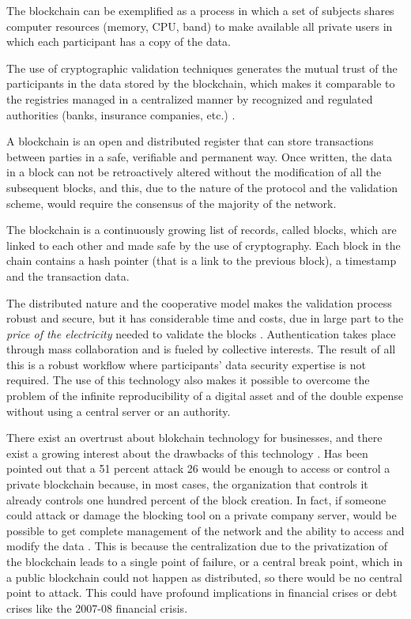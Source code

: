 \documentclass[]{book}
\theoremstyle{definition}
\theoremstyle{definition}
\theoremstyle{definition}
\theoremstyle{remark}
\begin{document}
The blockchain can be exemplified as a process in which a set of
subjects shares computer resources (memory, CPU, band) to make available
all private users in which each participant has a copy of the data.

The use of cryptographic validation techniques generates the mutual
trust of the participants in the data stored by the blockchain, which
makes it comparable to the registries managed in a centralized manner by
recognized and regulated authorities (banks, insurance companies, etc.)
\citep{pilkington201611}.

A blockchain is an open and distributed register that can store
transactions between parties in a safe, verifiable and permanent way.
Once written, the data in a block can not be retroactively altered
without the modification of all the subsequent blocks, and this, due to
the nature of the protocol and the validation scheme, would require the
consensus of the majority of the network. \citep{iansiti2017truth}

The blockchain is a continuously growing list of records, called blocks,
which are linked to each other and made safe by the use of cryptography.
Each block in the chain contains a hash pointer (that is a link to the
previous block), a timestamp and the transaction data.

The distributed nature and the cooperative model makes the validation
process robust and secure, but it has considerable time and costs, due
in large part to the \emph{price of the electricity} needed to validate
the blocks \citep{underwood2016blockchain}. Authentication takes place
through mass collaboration and is fueled by collective interests. The
result of all this is a robust workflow where participants' data
security expertise is not required. The use of this technology also
makes it possible to overcome the problem of the infinite
reproducibility of a digital asset and of the double expense without
using a central server or an authority. \citep{karame2012double}

There exist an overtrust about blokchain technology for businesses, and
there exist a growing interest about the drawbacks of this technology
\citep{eyal2018majority, lin2017survey, yli2016current}. Has been
pointed out that a 51 percent attack 26 would be enough to access or
control a private blockchain because, in most cases, the organization
that controls it already controls one hundred percent of the block
creation. In fact, if someone could attack or damage the blocking tool
on a private company server, would be possible to get complete
management of the network and the ability to access and modify the data
\citep{hampton2016understanding}. This is because the centralization due
to the privatization of the blockchain leads to a single point of
failure, or a central break point, which in a public blockchain could
not happen as distributed, so there would be no central point to attack.
This could have profound implications in financial crises or debt crises
like the 2007-08 financial crisis.
\end{document}
